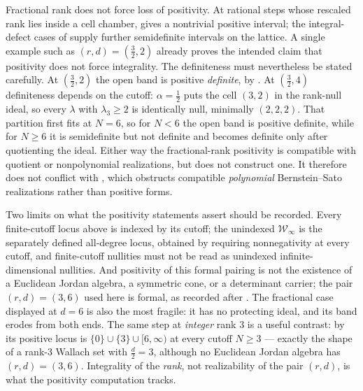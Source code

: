 \documentclass[11pt,letterpaper]{article}
\begin{document}
Fractional rank does not force loss of positivity. At rational steps whose
rescaled rank lies inside a cell chamber,  gives a nontrivial
positive interval; the integral-defect cases of  supply further
semidefinite intervals on the lattice. A single example such as
$(r,d)=(\tfrac32,2)$ already proves the intended claim that positivity does not
force integrality. The definiteness must nevertheless be stated carefully. At
$(\tfrac32,2)$ the open band is positive \emph{definite}, by . At
$(\tfrac32,4)$ definiteness depends on the cutoff: $\alpha=\tfrac12$ puts the cell
$(3,2)$ in the rank-null ideal, so every $\lambda$ with $\lambda_3\ge2$ is
identically null, minimally $(2,2,2)$. That partition first fits at $N=6$, so for
$N<6$ the open band is positive definite, while for $N\ge6$ it is semidefinite but
not definite and becomes definite only after quotienting the ideal. Either way the
fractional-rank positivity is compatible with quotient or nonpolynomial
realizations, but does not construct one. It therefore does not conflict with
, which obstructs compatible \emph{polynomial}
Bernstein--Sato realizations rather than positive forms.

Two limits on what the positivity statements assert should be recorded. Every
finite-cutoff locus above is indexed by its cutoff; the unindexed
$\mathcal W_\infty$ is the separately defined all-degree locus, obtained by
requiring nonnegativity at every cutoff, and finite-cutoff nullities must not be
read as unindexed infinite-dimensional nullities. And positivity of this formal
pairing is not the existence of a Euclidean Jordan algebra, a symmetric cone, or a
determinant carrier; the pair $(r,d)=(3,6)$ used here is formal, as recorded
after . The fractional case displayed at $d=6$ is also the most
fragile: it has no protecting ideal, and
its band erodes from both ends. The same step at \emph{integer} rank $3$ is a
useful contrast: by  its positive locus is
$\{0\}\cup\{3\}\cup[6,\infty)$ at every cutoff $N\ge3$ --- exactly the shape of a
rank-$3$ Wallach set with $\tfrac d2=3$, although no Euclidean Jordan algebra has
$(r,d)=(3,6)$. Integrality of the \emph{rank}, not realizability of the pair
$(r,d)$, is what the positivity computation tracks.
\end{document}
